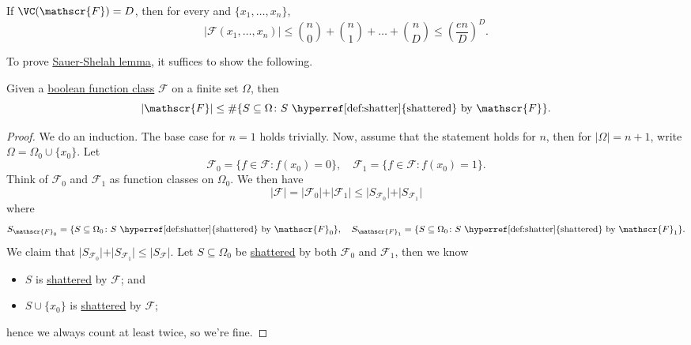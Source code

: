 \begin{lemma}\label{lma:Sauer-Shelah}
  If \(\VC(\mathscr{F}) = D\), then for every and \(\{ x_1, \dots , x_n \} \),
  \[
    \vert \mathscr{F} (x_1, \dots , x_n) \vert
    \leq \binom{n}{0} + \binom{n}{1} + \dots + \binom{n}{D}
    \leq \left( \frac{en}{D} \right) ^D.
  \]
\end{lemma}

To prove \hyperref[lma:Sauer-Shelah]{Sauer-Shelah lemma}, it suffices to show the following.

\begin{lemma}\label{lma:Pajor}
  Given a \hyperref[def:boolean-function-class]{boolean function class} \(\mathscr{F} \) on a finite set \(\Omega \), then
  \[
    \vert \mathscr{F} \vert \leq \#\{ S \subseteq \Omega \colon S \text{ \hyperref[def:shatter]{shattered} by } \mathscr{F} \}.
  \]
\end{lemma}
\begin{proof}
  We do an induction. The base case for \(n = 1\) holds trivially. Now, assume that the statement holds for \(n\), then for \(\vert \Omega \vert = n+1\), write \(\Omega = \Omega _0 \cup \{ x_0 \} \). Let
  \[
    \mathscr{F} _0 = \{ f\in \mathscr{F} \colon f(x_0) = 0\} ,\quad
    \mathscr{F} _1 = \{ f\in \mathscr{F} \colon f(x_0) = 1\} .
  \]
  Think of \(\mathscr{F} _0\) and \(\mathscr{F} _1\) as function classes on \(\Omega _0\). We then have
  \[
    \vert \mathscr{F} \vert
    = \vert \mathscr{F} _0 \vert + \vert \mathscr{F} _1 \vert
    \leq \vert S_{\mathscr{F} _0} \vert + \vert S_{\mathscr{F} _1} \vert
  \]
  where
  \[
    S_{\mathscr{F} _0} = \{ S \subseteq \Omega _0 \colon S \text{ \hyperref[def:shatter]{shattered} by } \mathscr{F} _0 \} ,\quad
    S_{\mathscr{F} _1} = \{ S \subseteq \Omega _0 \colon S \text{ \hyperref[def:shatter]{shattered} by } \mathscr{F} _1 \}.
  \]
  We claim that \(\vert S_{\mathscr{F} _0} \vert + \vert S_{\mathscr{F} _1} \vert \leq \vert S _{\mathscr{F} } \vert\). Let \(S \subseteq \Omega _0\) be \hyperref[def:shatter]{shattered} by both \(\mathscr{F} _0\) and \(\mathscr{F} _1\), then we know
  \begin{itemize}
    \item \(S\) is \hyperref[def:shatter]{shattered} by \(\mathscr{F} \); and
    \item \(S \cup \{ x_0 \} \) is \hyperref[def:shatter]{shattered} by \(\mathscr{F} \);
  \end{itemize}
  hence we always count at least twice, so we're fine.
\end{proof}


